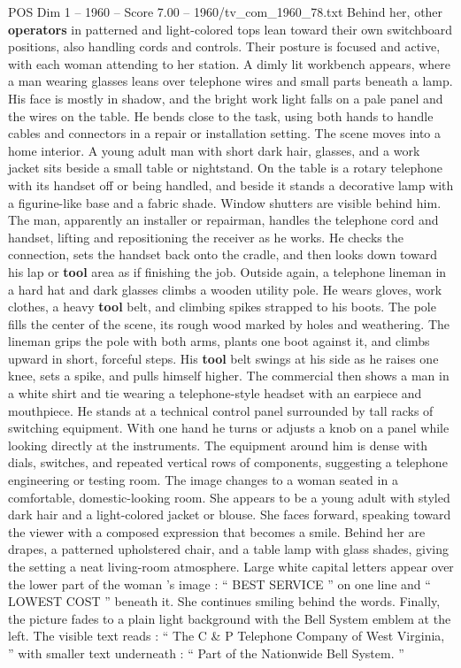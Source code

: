 \begin{textsample}{POS Dim 1 – 1960 – Score 7.00 – 1960/tv\_com\_1960\_78.txt}
Behind her, other \textbf{operators} in patterned and light-colored tops lean toward their own switchboard positions, also handling cords and controls.
Their posture is focused and active, with each woman attending to her station.
A dimly lit workbench appears, where a man wearing glasses leans over telephone wires and small parts beneath a lamp.
His face is mostly in shadow, and the bright work light falls on a pale panel and the wires on the table.
He bends close to the task, using both hands to handle cables and connectors in a repair or installation setting.
The scene moves into a home interior.
A young adult man with short dark hair, glasses, and a work jacket sits beside a small table or nightstand.
On the table is a rotary telephone with its handset off or being handled, and beside it stands a decorative lamp with a figurine-like base and a fabric shade.
Window shutters are visible behind him.
The man, apparently an installer or repairman, handles the telephone cord and handset, lifting and repositioning the receiver as he works.
He checks the connection, sets the handset back onto the cradle, and then looks down toward his lap or \textbf{tool} area as if finishing the job.
Outside again, a telephone lineman in a hard hat and dark glasses climbs a wooden utility pole.
He wears gloves, work clothes, a heavy \textbf{tool} belt, and climbing spikes strapped to his boots.
The pole fills the center of the scene, its rough wood marked by holes and weathering.
The lineman grips the pole with both arms, plants one boot against it, and climbs upward in short, forceful steps.
His \textbf{tool} belt swings at his side as he raises one knee, sets a spike, and pulls himself higher.
The commercial then shows a man in a white shirt and tie wearing a telephone-style headset with an earpiece and mouthpiece.
He stands at a technical control panel surrounded by tall racks of switching equipment.
With one hand he turns or adjusts a knob on a panel while looking directly at the instruments.
The equipment around him is dense with dials, switches, and repeated vertical rows of components, suggesting a telephone engineering or testing room.
The image changes to a woman seated in a comfortable, domestic-looking room.
She appears to be a young adult with styled dark hair and a light-colored jacket or blouse.
She faces forward, speaking toward the viewer with a composed expression that becomes a smile.
Behind her are drapes, a patterned upholstered chair, and a table lamp with glass shades, giving the setting a neat living-room atmosphere.
Large white capital letters appear over the lower part of the woman ’s image : “ BEST SERVICE ” on one line and “ LOWEST COST ” beneath it.
She continues smiling behind the words.
Finally, the picture fades to a plain light background with the Bell System emblem at the left.
The visible text reads : “ The C \& P Telephone Company of West Virginia, ” with smaller text underneath : “ Part of the Nationwide Bell System. ”

\end{textsample}
